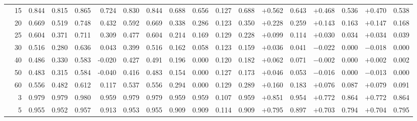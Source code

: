 \documentclass[conference]{IEEEtran}
\theoremstyle{remark}
\begin{document}
\begin{table}[ht]
{\begin{tabular}{p{2.2cm}r rrrr rr rr rr rr rr rr}
  & 15 & 0.844 & 0.815 & 0.865 & 0.724 & 0.830 & 0.844 & 0.688 & 0.656 & 0.127 & 0.688 & $+$0.562 & 0.643 & $+$0.468 & 0.536 & $+$0.470 & 0.538 \\
  & 20 & 0.669 & 0.519 & 0.748 & 0.432 & 0.592 & 0.669 & 0.338 & 0.286 & 0.123 & 0.350 & $+$0.228 & 0.259 & $+$0.143 & 0.163 & $+$0.147 & 0.168 \\
  & 25 & 0.604 & 0.371 & 0.711 & 0.309 & 0.477 & 0.604 & 0.214 & 0.169 & 0.129 & 0.228 & $+$0.099 & 0.114 & $+$0.030 & 0.034 & $+$0.034 & 0.039 \\
  & 30 & 0.516 & 0.280 & 0.636 & 0.043 & 0.399 & 0.516 & 0.162 & 0.058 & 0.123 & 0.159 & $+$0.036 & 0.041 & $-$0.022 & 0.000 & $-$0.018 & 0.000 \\
  & 40 & 0.486 & 0.330 & 0.583 & -0.020 & 0.427 & 0.491 & 0.196 & 0.000 & 0.120 & 0.182 & $+$0.062 & 0.071 & $-$0.002 & 0.000 & $+$0.002 & 0.002 \\
  & 50 & 0.483 & 0.315 & 0.584 & -0.040 & 0.416 & 0.483 & 0.154 & 0.000 & 0.127 & 0.173 & $+$0.046 & 0.053 & $-$0.016 & 0.000 & $-$0.013 & 0.000 \\
  & 60 & 0.556 & 0.482 & 0.612 & 0.117 & 0.537 & 0.556 & 0.294 & 0.000 & 0.129 & 0.289 & $+$0.160 & 0.183 & $+$0.076 & 0.087 & $+$0.079 & 0.091 \\
\midrule
{}
  & 3  & 0.979 & 0.979 & 0.980 & 0.959 & 0.979 & 0.979 & 0.959 & 0.959 & 0.107 & 0.959 & $+$0.851 & 0.954 & $+$0.772 & 0.864 & $+$0.772 & 0.864 \\
  & 5  & 0.955 & 0.952 & 0.957 & 0.913 & 0.953 & 0.955 & 0.909 & 0.909 & 0.114 & 0.909 & $+$0.795 & 0.897 & $+$0.703 & 0.794 & $+$0.704 & 0.795 \\

\end{tabular}}
\end{table}
\end{document}
